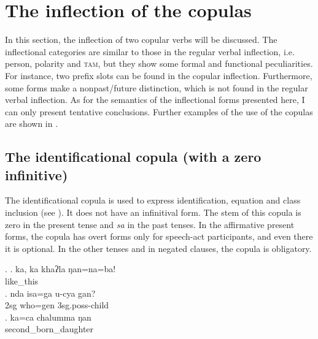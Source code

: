 \section{The inflection of the copulas}\label{cop-infl}
 
In this section, the inflection of two copular verbs will be discussed. The inflectional categories are similar to those in the regular verbal inflection, i.e. person, polarity and \textsc{tam}, but they show some formal and functional peculiarities. For instance, two prefix slots can be found in the copular inflection. Furthermore, some forms make a nonpast/future distinction, which is not found in the regular verbal inflection. As for the semantics of the inflectional forms presented here, I can only present tentative conclusions. Further examples of the use of the copulas are shown in . 

\subsection{The identificational copula (with a zero infinitive)}

The identificational copula is used to express identification, equation and class inclusion (see \Next). It does not have an infinitival form. The stem of this copula is zero in the present tense and \emph{sa} in the past tenses. In the affirmative present forms, the copula has overt forms only for speech-act participants, and even there it is optional. In the other tenses and in negated clauses, the copula is obligatory. 


\ex. \ag. ka, ka khaʔla    ŋan=na=ba!      \\
    like\_this \\
\bg. nda isa=ga u-cya gan?\\
{\sc 2sg} who{\sc =gen} {\sc 3sg.poss}-child  \\
\bg. ka=ca chalumma ŋan\\
 second\_born\_daughter  \\


